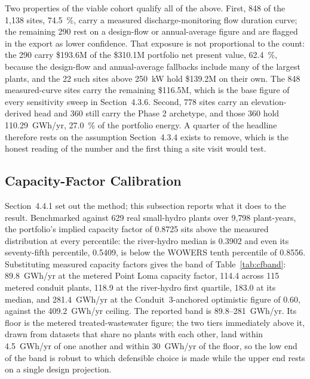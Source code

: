 \documentclass[12pt,letterpaper]{report}
\begin{document}
Two properties of the viable cohort qualify all of the above. First, 848 of the
1{,}138 sites, 74.5~\%, carry a measured discharge-monitoring flow duration curve;
the remaining 290 rest on a design-flow or annual-average figure and are flagged
in the export as lower confidence. That exposure is not proportional to the
count: the 290 carry \$193.6M of the \$310.1M portfolio net present value,
62.4~\%, because the design-flow and annual-average fallbacks include many of
the largest plants, and the 22 such sites above 250~kW hold \$139.2M on their
own. The 848 measured-curve sites carry the remaining \$116.5M, which is the
base figure of every sensitivity sweep in Section~4.3.6. Second, 778 sites carry an elevation-derived
head and 360 still carry the Phase 2 archetype, and those 360 hold 110.29~GWh/yr,
27.0~\% of the portfolio energy. A quarter of the headline therefore rests on the
assumption Section~4.3.4 exists to remove, which is the honest reading of the
number and the first thing a site visit would test.

\subsection{Capacity-Factor Calibration}                 %

Section~4.4.1 set out the method; this subsection reports what it does to the
result. Benchmarked against 629 real small-hydro plants over 9{,}798 plant-years,
the portfolio's implied capacity factor of 0.8725 sits above the measured
distribution at every percentile: the river-hydro median is 0.3902 and even its
seventy-fifth percentile, 0.5409, is below the WOWERS tenth percentile of 0.8556.
Substituting measured capacity factors gives the band of Table~\ref{tab:cfband}:
89.8~GWh/yr at the metered Point Loma capacity factor, 114.4 across 115 metered
conduit plants, 118.9 at the river-hydro first quartile, 183.0 at its median, and
281.4~GWh/yr at the Conduit~3-anchored optimistic figure of 0.60, against the
409.2~GWh/yr ceiling. The reported band is 89.8--281~GWh/yr. Its floor is the
metered treated-wastewater figure; the two tiers immediately above it, drawn from
datasets that share no plants with each other, land within 4.5~GWh/yr of one another and
within 30~GWh/yr of the floor, so the low end of the band is robust to which defensible
choice is made while the upper end rests on a single design projection.
\end{document}
